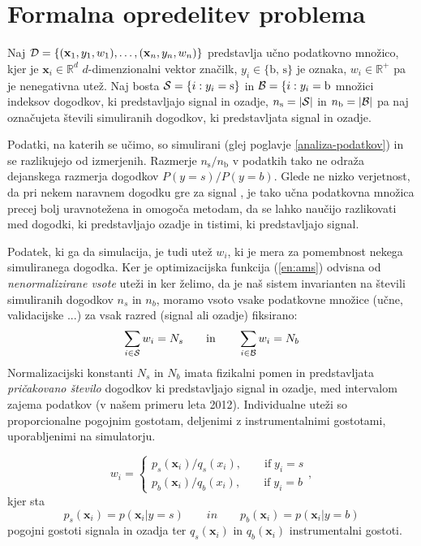 \documentclass[11pt,a4paper,openany]{book}
\begin{document}
\section{Formalna opredelitev problema}


Naj ${\cal D} = \left\{({\mathbf x}_1, y_1, w_1), \dots, ({\mathbf x}_n, y_n, w_n) \right\}$ predstavlja učno podatkovno množico, kjer je $\mathbf{x}_i \in \mathbb{R}^d$ $d$-dimenzionalni vektor značilk, $y_i \in \{\text{b, s}\}$ je oznaka, $w_i \in \mathbb{R}^+$ pa je nenegativna utež. Naj bosta ${\cal S} = \{i : y_i = \text{s}\}$ in ${\cal B} = \{i : y_i = \text{b}$ množici indeksov dogodkov, ki predstavljajo signal in ozadje, $n_\text{s} = |{\cal S}|$ in $n_\text{b} = |{\cal B}|$ pa naj označujeta števili simuliranih dogodkov, ki predstavljata signal in ozadje.

Podatki, na katerih se učimo, so simulirani (glej poglavje \ref{analiza-podatkov}) in se razlikujejo od izmerjenih. Razmerje $n_\text{s} / n_\text{b}$ v podatkih tako ne odraža dejanskega razmerja dogodkov $P(y = s) / P(y = b)$. Glede ne nizko verjetnost, da pri nekem naravnem dogodku gre za signal \cite{Adam-Bourdarios14}, je tako učna podatkovna množica precej bolj uravnotežena in omogoča metodam, da se lahko naučijo razlikovati med dogodki, ki predstavljajo ozadje in tistimi, ki predstavljajo signal.

Podatek, ki ga da simulacija, je tudi utež $w_i$, ki je mera za pomembnost nekega simuliranega dogodka. Ker je optimizacijska funkcija (\ref{en:ams}) odvisna od \textit{nenormalizirane vsote} uteži in ker želimo, da je naš sistem invarianten na števili simuliranih dogodkov $n_s$ in $n_b$, moramo vsoto vsake podatkovne množice (učne, validacijske ...) za vsak razred (signal ali ozadje) fiksirano:
\begin{equation}
\sum_{i \in \cal{S}}{w_i} = N_s
\qquad\text{in}\qquad
\sum_{i \in \cal{B}}{w_i} = N_b
\end{equation}
Normalizacijski konstanti $N_s$ in $N_b$ imata fizikalni pomen in predstavljata \textit{pričakovano število} dogodkov ki predstavljajo signal in ozadje, med intervalom zajema podatkov (v našem primeru leta 2012). Individualne uteži so proporcionalne pogojnim gostotam, deljenimi z instrumentalnimi gostotami, uporabljenimi na simulatorju.

\begin{equation}
	w_i = \left\{\begin{array}{r}
		p_s(\textbf{x}_i)/q_s(x_i),\qquad \text{if}\;y_i = s \\
		p_b(\textbf{x}_i)/q_b(x_i),\qquad \text{if}\;y_i = b 
	\end{array}
	\right.,
\end{equation}
kjer sta
\begin{equation*}
p_s(\textbf{x}_i) = p(\textbf{x}_i|y = s) \qquad in \qquad p_b(\textbf{x}_i) = p(\textbf{x}_i|y = b)
\end{equation*}
pogojni gostoti signala in ozadja ter $q_s(\textbf{x}_i)$ in $q_b(\textbf{x}_i)$ instrumentalni gostoti.
\end{document}
